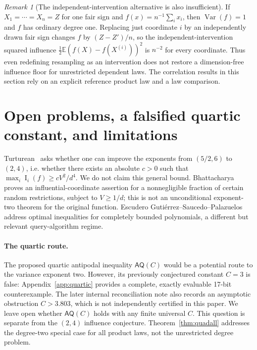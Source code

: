 \documentclass[11pt]{article}
\numberwithin{equation}{section}
\theoremstyle{remark}
\newtheorem{remark}[theorem]{Remark}
\newcommand{\Inf}{\operatorname{I}}
\begin{document}
\begin{remark}[The independent-intervention alternative is also insufficient]
If $X_1=\cdots=X_n=Z$ for one fair sign and
$f(x)=n^{-1}\sum_i x_i$, then $\operatorname{Var}(f)=1$ and
$f$ has ordinary degree one. Replacing just coordinate $i$
by an independently drawn fair sign changes $f$ by
$(Z-Z')/n$, so the independent-intervention squared influence
$\frac12\mathbb E(f(X)-f(X^{(i)}))^2$ is $n^{-2}$ for every
coordinate. Thus even redefining resampling as an intervention
does not restore a dimension-free influence floor for unrestricted
dependent laws. The correlation results in this section rely on
an explicit reference product law and a law comparison.
\end{remark}

\section{Open problems, a falsified quartic constant, and limitations}\label{sec:open}
Turturean~\cite[Section~9.5]{Tur26} asks whether one can improve the exponents from $(5/2,6)$ to $(2,4)$, i.e. whether there exists an absolute $c>0$ such that $\max_i\Inf_i(f)\ge cV^2/d^4$. We do not claim this general bound. Bhattacharya~\cite[Theorem~5]{Bha24} proves an influential-coordinate assertion for a nonnegligible fraction of certain random restrictions, subject to $V\ge1/d$; this is not an unconditional exponent-two theorem for the original function. Escudero Guti\'errez--Saucedo--Palazuelos~\cite{ESP26} address optimal inequalities for completely bounded polynomials, a different but relevant query-algorithm regime.

\paragraph{The quartic route.}
The proposed quartic antipodal inequality $\mathsf{AQ}(C)$ would be a
potential route to the variance exponent two. However, its previously
conjectured constant $C=3$ is false: Appendix~\ref{app:quartic}
provides a complete, exactly evaluable 17-bit counterexample.
The later internal reconciliation note also records an asymptotic
obstruction $C>3.803$, which is not independently certified in this paper.
We leave open whether $\mathsf{AQ}(C)$ holds with any finite universal $C$.
This question is separate from the $(2,4)$ influence conjecture. Theorem~\ref{thm:quadall} addresses the degree-two special case for all product laws, not the unrestricted degree problem.
\end{document}
